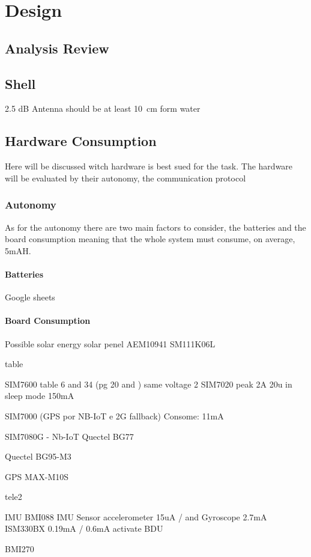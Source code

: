 
\chapter{Design}
\section{Analysis Review}

\section{Shell}
2.5 dB Antenna should be at least 10 cm form water 

\section{Hardware Consumption}
Here will be discussed witch hardware is best sued for the task. The hardware will be evaluated by their
autonomy, the communication protocol
\subsection{Autonomy}
As for the autonomy there are two main factors to consider, the batteries and the board consumption
meaning that the whole system must consume, on average, 5mAH.
\subsubsection{Batteries}
Google sheets

\subsubsection{Board Consumption}

Possible solar energy
solar penel
AEM10941
SM111K06L

table

SIM7600 
table 6 and 34 (pg 20 and ) same voltage
2
SIM7020
peak 2A 20u in sleep mode 150mA

SIM7000 (GPS por NB-IoT e 2G fallback)
Consome: 11mA

SIM7080G - Nb-IoT
Quectel BG77

Quectel BG95-M3

 
GPS
MAX-M10S

tele2

IMU
BMI088 IMU Sensor
accelerometer 15uA  / and Gyroscope 2.7mA
ISM330BX
0.19mA / 0.6mA
activate BDU

BMI270


